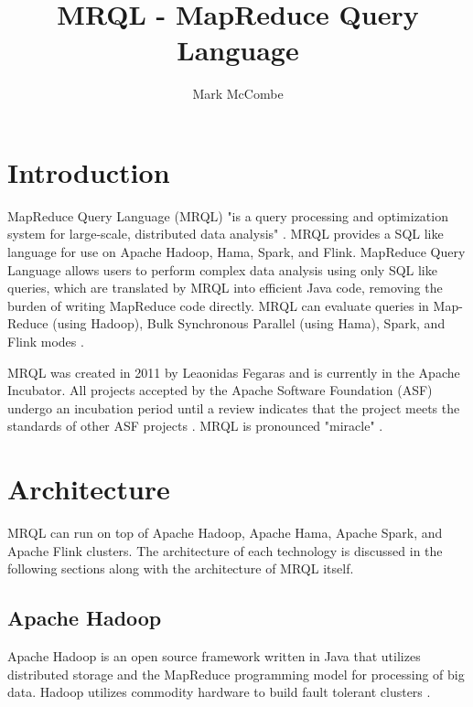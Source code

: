\documentclass[9pt,twocolumn,twoside]{../../styles/osajnl}
\title{MRQL - MapReduce Query Language}
\author[1,*]{Mark McCombe}
\affil[1]{School of Informatics and Computing, Bloomington, IN 47408, U.S.A.}
\affil[*]{Corresponding authors: mmccombe@iu.edu}
\begin{document}
\maketitle

\section{Introduction}

MapReduce Query Language (MRQL) "is a query processing and optimization system for large-scale, distributed data analysis" \cite{www-apacheincubator}. MRQL provides a SQL like language for use on Apache Hadoop, Hama, Spark, and Flink. MapReduce Query Language allows users to perform complex data analysis using only SQL like queries, which are translated by MRQL into efficient Java code, removing the burden of writing MapReduce code directly. MRQL can evaluate queries in Map-Reduce (using Hadoop), Bulk Synchronous Parallel (using Hama), Spark, and Flink modes \cite{www-apacheincubator}.

MRQL was created in 2011 by Leaonidas Fegaras \cite{www-mrqlhadoop} and is currently in the Apache Incubator. All projects accepted by the Apache Software Foundation (ASF) undergo an incubation period until a review indicates that the project meets the standards of other ASF projects \cite{www-apachemrql}.  MRQL is pronounced "miracle" \cite{www-apacheincubator}.

\section{Architecture}

MRQL can run on top of Apache Hadoop, Apache Hama, Apache Spark, and Apache Flink clusters.  The architecture of each technology is discussed in the following sections along with the architecture of MRQL itself. 





\subsection{Apache Hadoop}

Apache Hadoop is an open source framework written in Java that utilizes distributed storage and the MapReduce programming model for processing of big data. Hadoop utilizes commodity hardware to build fault tolerant clusters \cite{www-wikihadoop}. 
\end{document}

